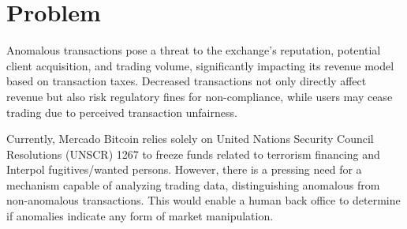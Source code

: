 \section{Problem}
Anomalous transactions pose a threat to the exchange's reputation, potential client acquisition, and trading volume,
significantly impacting its revenue model based on transaction taxes. Decreased transactions not only directly affect
revenue but also risk regulatory fines for non-compliance, while users may cease trading due to perceived transaction
unfairness.

Currently, Mercado Bitcoin relies solely on United Nations Security Council Resolutions (UNSCR) 1267 to freeze funds
related to terrorism financing and Interpol fugitives/wanted persons. However, there is a pressing need for a mechanism
capable of analyzing trading data, distinguishing anomalous from non-anomalous transactions. This would enable a human
back office to determine if anomalies indicate any form of market manipulation.